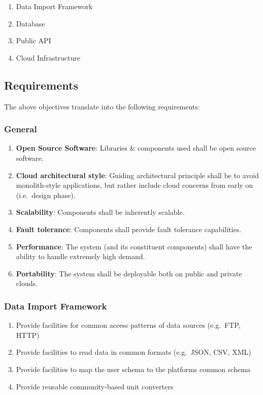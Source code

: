 \begin{enumerate}
\def\labelenumi{\arabic{enumi}.}
\tightlist
\item
  Data Import Framework
\item
  Database
\item
  Public API
\item
  Cloud Infrastructure
\end{enumerate}

\subsection{Requirements}\label{requirements}

The above objectives translate into the following requirements:

\subsubsection{General}\label{general}

\begin{enumerate}
\def\labelenumi{\arabic{enumi}.}
\tightlist
\item
  \textbf{Open Source Software}: Libraries \& components used shall be
  open source software.
\item
  \textbf{Cloud architectural style}: Guiding architectural principle
  shall be to avoid monolith-style applications, but rather include
  cloud concerns from early on (i.e.~design phase).
\item
  \textbf{Scalability}: Components shall be inherently scalable.
\item
  \textbf{Fault tolerance}: Components shall provide fault tolerance
  capabilities.
\item
  \textbf{Performance}: The system (and its constituent components)
  shall have the ability to handle extremely high demand.
\item
  \textbf{Portability}: The system shall be deployable both on public
  and private clouds.
\end{enumerate}

\subsubsection{Data Import Framework}\label{data-import-framework}

\begin{enumerate}
\def\labelenumi{\arabic{enumi}.}
\tightlist
\item
  Provide facilities for common access patterns of data sources
  (e.g.~FTP, HTTP)
\item
  Provide facilities to read data in common formats (e.g.~JSON, CSV,
  XML)
\item
  Provide facilities to map the user schema to the platforms common
  schema
\item
  Provide reusable community-based unit converters
\end{enumerate}

